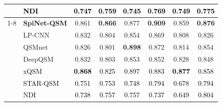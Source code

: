 \documentclass[sn-vancouver,Numbered]{sn-jnl}%
\begin{document}
\begin{table}[htbp]
{\begin{tabular}{llcccccc}
 

&\textcolor{black}{NDI}               
&\textcolor{black}{0.747}
&\textcolor{black}{0.759}
&\textcolor{black}{0.745}
&\textcolor{black}{0.769}
&\textcolor{black}{0.749}
&\textcolor{black}{0.775}\\ 











\cmidrule{1-8}




\multirow{5}{*}{GP}        
& \textbf{SpiNet-QSM}   
&0.861
&\textbf{0.866}
&0.877
&\textbf{0.909}
&0.859
&\textbf{0.876} \\ 


& LP-CNN                
&0.832
&0.804
&0.854
&0.869
&0.808
&0.826\\ 


& QSMnet                
&0.826
&0.801
&\textbf{0.898}
&0.872
&0.814
&0.854\\ 


& DeepQSM               
&0.832
&0.803
&0.853
&0.852
&0.828
&0.848\\ 


&\textcolor{black}{xQSM}               
&\textcolor{black}{\textbf{0.868}}
&\textcolor{black}{0.825}
&\textcolor{black}{0.897}
&\textcolor{black}{0.883}
&\textcolor{black}{\textbf{0.877}}
&\textcolor{black}{0.858}\\

&\textcolor{black}{STAR-QSM}               
&\textcolor{black}{0.751}
&\textcolor{black}{0.753}
&\textcolor{black}{0.748}
&\textcolor{black}{0.794}
&\textcolor{black}{0.678}
&\textcolor{black}{0.794} \\ 



& \textcolor{black}{NDI}               
&\textcolor{black}{0.738}
&\textcolor{black}{0.757}
&\textcolor{black}{0.757}
&\textcolor{black}{0.737}
&\textcolor{black}{0.649}
&\textcolor{black}{0.804}\\ 









\end{tabular} }
\label{tab:roi_table}
\end{table}
\end{document}

